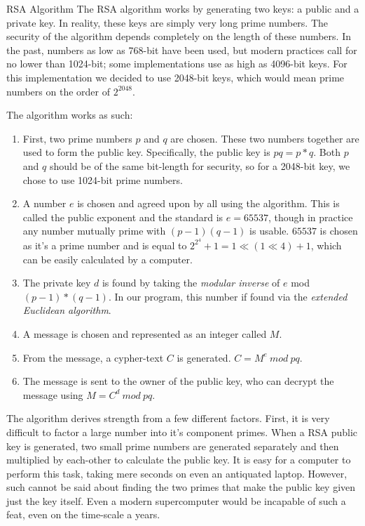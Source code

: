 \documentclass[landscape,fontscale=.4,paperwidth=48in,paperheight=36in]{baposter} %
\begin{document}
\begin{poster}
\begin{posterbox}[name=rsa,column=13,row=0,span=17]{RSA Algorithm}
The RSA algorithm works by generating two keys: a public and a private key. In reality, these keys are simply very long prime numbers. The security of the algorithm depends completely on the length of these numbers. In the past, numbers as low as 768-bit have been used, but modern practices call for no lower than 1024-bit; some implementations use as high as 4096-bit keys. For this implementation we decided to use 2048-bit keys, which would mean prime numbers on the order of $2^{2048}$.

The algorithm works as such:
\begin{enumerate}
	\item First, two prime numbers $p$ and $q$ are chosen. These two numbers together are used to form the public key. Specifically, the public key is ${pq = p * q}$. Both $p$ and $q$ should be of the same bit-length for security, so for a 2048-bit key, we chose to use 1024-bit prime numbers. 
	\item A number $e$ is chosen and agreed upon by all using the algorithm. This is called the public exponent and the standard is $e = 65537$, though in practice any number mutually prime with ${(p-1)(q-1)}$ is usable. $65537$ is chosen as it's a prime number and is equal to ${2^{2^4}+1 = 1 \ll (1 \ll 4) + 1}$, which can be easily calculated by a computer.
	\item The private key $d$ is found by taking the \emph{modular inverse} of $e$ mod ${(p-1)*(q-1)}$. In our program, this number if found via the \emph{extended Euclidean algorithm}.
	\item A message is chosen and represented as an integer called $M$.
	\item From the message, a cypher-text $C$ is generated. $C = M^e\ mod\ pq$.
	\item The message is sent to the owner of the public key, who can decrypt the message using $M = C^d\ mod\ pq$.
\end{enumerate}

The algorithm derives strength from  a few different factors. First, it is very difficult to factor a large number into it's component primes. When a RSA public key is generated, two small prime numbers are generated separately and then multiplied by each-other to calculate the public key. It is easy for a computer to perform this task, taking mere seconds on even an antiquated laptop. However, such cannot be said about finding the two primes that make the public key given just the key itself. Even a modern supercomputer would be incapable of such a feat, even on the time-scale a years.


\end{posterbox}
\end{poster}
\end{document}
